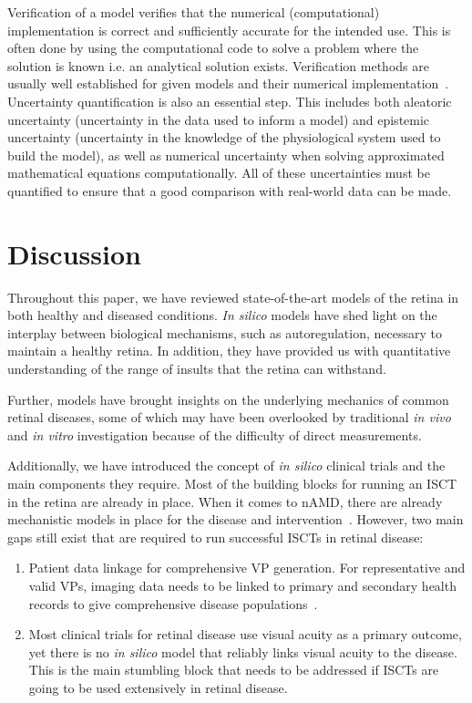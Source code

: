 \documentclass{article}
\begin{document}
Verification of a model verifies that the numerical (computational) implementation is correct and sufficiently accurate for the intended use.
This is often done by using the computational code to solve a problem where the solution is known i.e. an analytical solution exists.
Verification methods are usually well established for given models and their numerical implementation~\cite{Curreli2021, Pappalardo2019}. 
Uncertainty quantification is also an essential step. 
This includes both aleatoric uncertainty (uncertainty in the data used to inform a model) and epistemic uncertainty (uncertainty in the knowledge of the physiological system used to build the model), as well as numerical uncertainty when solving approximated mathematical equations computationally. 
All of these uncertainties must be quantified to ensure that a good comparison with real-world data can be made.


\section{Discussion}\label{sec:Conclusion}

Throughout this paper, we have reviewed state-of-the-art models of the retina in both healthy and diseased conditions.
\textit{In silico} models have shed light on the interplay between biological mechanisms, such as autoregulation, necessary to maintain a healthy retina.
In addition, they have provided us with quantitative understanding of the range of insults that the retina can withstand.

Further, models have brought insights on the underlying mechanics of common retinal diseases, some of which may have been overlooked by traditional \textit{in vivo} and \textit{in vitro} investigation because of the difficulty of direct measurements.

Additionally, we have introduced the concept of \textit{in silico} clinical trials and the main components they require. 
Most of the building blocks for running an ISCT in the retina are already in place. When it comes to nAMD, there are already mechanistic models in place for the disease and intervention~\cite{Hoyle_2017, Vega2021}. However, two main gaps still exist that are required to run successful ISCTs in retinal disease: 

\begin{enumerate}
\item{Patient data linkage for comprehensive VP generation. For representative and valid VPs, imaging data needs to be linked to primary and secondary health records to give comprehensive disease populations~\cite{ElBouri2021}.}

\item{Most clinical trials for retinal disease use visual acuity as a primary outcome, yet there is no \textit{in silico} model that reliably links visual acuity to the disease. This is the main stumbling block that needs to be addressed if ISCTs are going to be used extensively in retinal disease.}
\end{enumerate}
\end{document}
